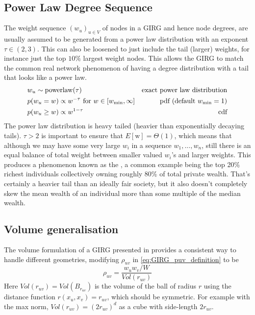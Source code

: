 \subsection{Power Law Degree Sequence} The weight sequence $(w_u)_{u \in V}$ of nodes in a GIRG and hence node degrees, are usually assumed to be generated from a power law distribution with an exponent $\tau \in (2, 3)$. This can also be loosened to just include the tail (larger) weights, for instance just the top $10\%$ largest weight nodes.
This allows the GIRG to match the common real network phenomenon of having a degree distribution with a tail that looks like a power law.
\begin{align}
& w_u \sim \operatorname{powerlaw}(\tau)
& \text{exact power law distribution}
\\
& p(w_u = w) \propto w^{-\tau} \text{ for } w \in [w_{\min }, \infty]
& \text{pdf (default $w_{\min } = 1$)}
\\
& p(w_u \geq w) \propto w^{1 - \tau}
& \text{cdf}
\end{align}
The power law distribution is heavy tailed (heavier than exponentially decaying tails). $\tau > 2$ is important to ensure that $E[\mathrm{w}] = \Theta(1)$, which means that although we may have some very large $w_i$ in a sequence $w_1, ..., w_n$, still there is an equal balance of total weight between smaller valued $w_i$'s and larger weights. This produces a phenomenon known as the , a common example being the top 20\% richest individuals collectively owning roughly 80\% of total private wealth. That's certainly a heavier tail than an ideally fair society, but it also doesn't completely skew the mean wealth of an individual more than some multiple of the median wealth.


\subsection{Volume generalisation}
The volume formulation of a GIRG presented in \cite{bringmann2019geometric} provides a consistent way to handle different geometries, modifying $\rho_{uv}$ in \cref{eq:GIRG_puv_definition} to be 
\begin{equation}
    \rho_{uv} = \frac{w_u w_v / W}{Vol(r_{uv})}
\end{equation}
Here $Vol(r_{uv}) = Vol(B_{r_{uv}})$ is the volume of the ball of radius $r$ using the distance function $r(x_u, x_v) = r_{uv}$, which should be symmetric.
For example with the max norm, $Vol(r_{uv}) = (2r_{uv})^d$ as a cube with side-length $2r_{uv}$.


